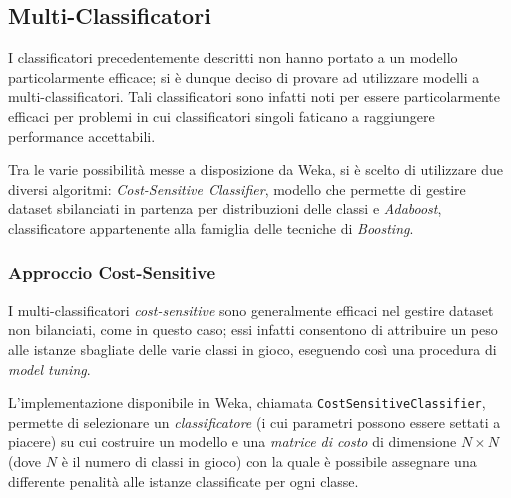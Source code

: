 

\subsection{Multi-Classificatori}

I classificatori precedentemente descritti non hanno portato a un modello particolarmente efficace;
si è dunque deciso di provare ad utilizzare modelli a multi-classificatori.
Tali classificatori sono infatti noti per essere particolarmente efficaci per problemi in cui classificatori singoli faticano a raggiungere performance accettabili.

Tra le varie possibilità messe a disposizione da Weka, si è scelto di utilizzare due diversi algoritmi:
\emph{Cost-Sensitive Classifier}, modello che permette di gestire dataset sbilanciati in partenza per distribuzioni delle classi e \emph{Adaboost}, classificatore appartenente alla famiglia delle tecniche di \emph{Boosting}.

\subsubsection{Approccio Cost-Sensitive}

I multi-classificatori \emph{cost-sensitive} sono generalmente efficaci nel gestire dataset non bilanciati, come in questo caso;
essi infatti consentono di attribuire un peso alle istanze sbagliate delle varie classi in gioco, eseguendo così una procedura di \emph{model tuning}.

L'implementazione disponibile in Weka, chiamata \texttt{CostSensitiveClassifier},
permette di selezionare un \emph{classificatore} (i cui parametri possono essere settati a piacere) su cui costruire un modello
e una \emph{matrice di costo} di dimensione \(N×N\) (dove \(N\) è il numero di classi in gioco) con la quale è possibile assegnare una differente penalità alle istanze classificate per ogni classe.

